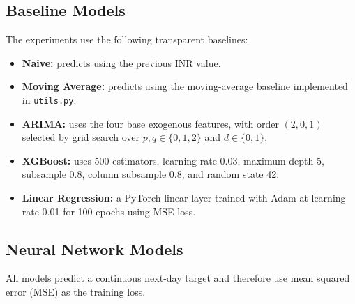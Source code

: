 \subsection{Baseline Models}

The experiments use the following transparent baselines:
\begin{itemize}[leftmargin=1.5cm]
    \item \textbf{Naive:} predicts using the previous INR value.
    \item \textbf{Moving Average:} predicts using the moving-average baseline implemented in \texttt{utils.py}.
    \item \textbf{ARIMA:} uses the four base exogenous features, with order $(2,0,1)$ selected by grid search over $p,q\in\{0,1,2\}$ and $d\in\{0,1\}$.
    \item \textbf{XGBoost:} uses 500 estimators, learning rate 0.03, maximum depth 5, subsample 0.8, column subsample 0.8, and random state 42.
    \item \textbf{Linear Regression:} a PyTorch linear layer trained with Adam at learning rate 0.01 for 100 epochs using MSE loss.
\end{itemize}

\subsection{Neural Network Models}

All models predict a continuous next-day target and therefore use mean squared error (MSE) as the training loss.

